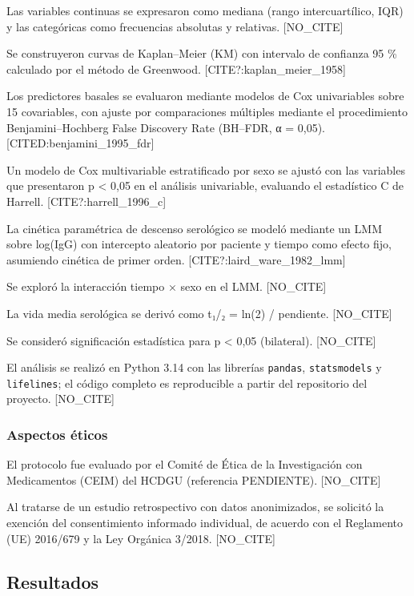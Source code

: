 \documentclass[
  spanish,
  12pt,
  a4paper,
]{article}
\begin{document}
Las variables continuas se expresaron como mediana (rango
intercuartílico, IQR) y las categóricas como frecuencias absolutas y
relativas. {[}NO\_CITE{]}

Se construyeron curvas de Kaplan--Meier (KM) con intervalo de confianza
95 \% calculado por el método de Greenwood.
{[}CITE?:kaplan\_meier\_1958{]}

Los predictores basales se evaluaron mediante modelos de Cox
univariables sobre 15 covariables, con ajuste por comparaciones
múltiples mediante el procedimiento Benjamini--Hochberg False Discovery
Rate (BH--FDR, α = 0,05). {[}CITED:benjamini\_1995\_fdr{]}

Un modelo de Cox multivariable estratificado por sexo se ajustó con las
variables que presentaron p \textless{} 0,05 en el análisis univariable,
evaluando el estadístico C de Harrell. {[}CITE?:harrell\_1996\_c{]}

La cinética paramétrica de descenso serológico se modeló mediante un LMM
sobre log(IgG) con intercepto aleatorio por paciente y tiempo como
efecto fijo, asumiendo cinética de primer orden.
{[}CITE?:laird\_ware\_1982\_lmm{]}

Se exploró la interacción tiempo × sexo en el LMM. {[}NO\_CITE{]}

La vida media serológica se derivó como t₁/₂ = ln(2) / pendiente.
{[}NO\_CITE{]}

Se consideró significación estadística para p \textless{} 0,05
(bilateral). {[}NO\_CITE{]}

El análisis se realizó en Python 3.14 con las librerías \texttt{pandas},
\texttt{statsmodels} y \texttt{lifelines}; el código completo es
reproducible a partir del repositorio del proyecto. {[}NO\_CITE{]}

\subsubsection{Aspectos éticos}\label{aspectos-uxe9ticos}

El protocolo fue evaluado por el Comité de Ética de la Investigación con
Medicamentos (CEIM) del HCDGU (referencia PENDIENTE). {[}NO\_CITE{]}

Al tratarse de un estudio retrospectivo con datos anonimizados, se
solicitó la exención del consentimiento informado individual, de acuerdo
con el Reglamento (UE) 2016/679 y la Ley Orgánica 3/2018. {[}NO\_CITE{]}

\subsection*{Resultados}\label{resultados}
\end{document}
